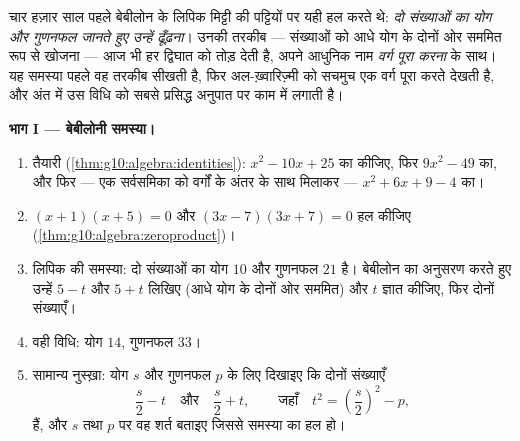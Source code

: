 \begin{problem}[{सप्ताहांत समस्या --- योग-और-गुणनफल की समस्याएँ, अल-ख़्वारिज़्मी
के खींचे चित्र के अनुसार वर्ग पूरा करना, और समीकरण $x^2 = x + 1$}]
\label{pb:g10:algebra:1}
चार हज़ार साल पहले बेबीलोन के लिपिक मिट्टी की पट्टियों पर यही हल करते थे:
\emph{दो संख्याओं का योग और गुणनफल जानते हुए उन्हें ढूँढ़ना}। उनकी तरकीब ---
संख्याओं को आधे योग के दोनों ओर सममित रूप से खोजना --- आज भी हर द्विघात
 को तोड़ देती है, अपने आधुनिक नाम \emph{वर्ग पूरा करना} के साथ। यह
समस्या पहले वह तरकीब सीखती है, फिर अल-ख़्वारिज़्मी को सचमुच एक वर्ग पूरा
करते देखती है, और अंत में उस विधि को सबसे प्रसिद्ध अनुपात पर काम में लगाती
है।

\medskip
\noindent\textbf{भाग I --- बेबीलोनी समस्या।}
\begin{enumerate}
  \item तैयारी (\cref{thm:g10:algebra:identities}): $x^2 - 10x + 25$ का  कीजिए, फिर $9x^2 - 49$ का, और फिर ---
        एक सर्वसमिका को वर्गों के अंतर के साथ मिलाकर --- $x^2 + 6x + 9 - 4$ का।
  \item $(x + 1)(x + 5) = 0$ और $(3x - 7)(3x + 7) = 0$ हल कीजिए (\cref{thm:g10:algebra:zeroproduct})।
  \item लिपिक की समस्या: दो संख्याओं का योग $10$ और गुणनफल $21$ है।
        बेबीलोन का अनुसरण करते हुए उन्हें $5 - t$ और $5 + t$ लिखिए (आधे योग के
        दोनों ओर सममित) और $t$ ज्ञात कीजिए, फिर दोनों संख्याएँ।
  \item वही विधि: योग $14$, गुणनफल $33$।
  \item सामान्य नुस्ख़ा: योग $s$ और गुणनफल $p$ के लिए दिखाइए कि दोनों
        संख्याएँ
        \[
        \frac s2 - t
        \quad\text{और}\quad
        \frac s2 + t,
        \qquad\text{जहाँ}\quad
        t^2 = \left(\frac s2\right)^2 - p ,
        \]
        हैं, और $s$ तथा $p$ पर वह शर्त बताइए जिससे समस्या का हल हो।
\end{enumerate}


\end{problem}
